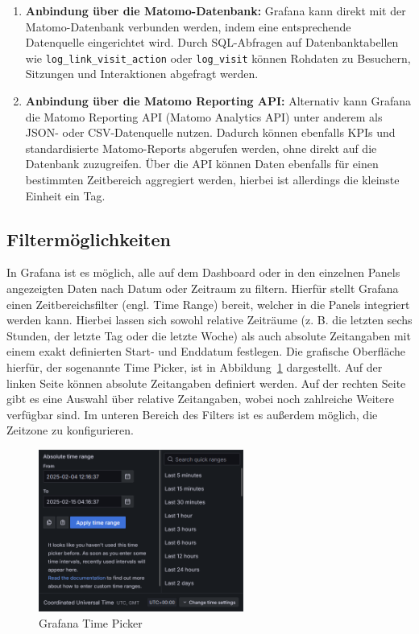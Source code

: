 \begin{enumerate}
    \item \textbf{Anbindung über die Matomo-Datenbank:}  
    Grafana kann direkt mit der Matomo-Datenbank verbunden werden, indem eine entsprechende Datenquelle eingerichtet wird. Durch SQL-Abfragen auf Datenbanktabellen wie \verb|log_link_visit_action| oder \verb|log_visit| können Rohdaten zu Besuchern, Sitzungen und Interaktionen abgefragt werden. 
    \item \textbf{Anbindung über die Matomo Reporting API:}  
    Alternativ kann Grafana die Matomo Reporting API (Matomo Analytics API) unter anderem als JSON- oder CSV-Datenquelle nutzen. Dadurch können ebenfalls KPIs und standardisierte Matomo-Reports abgerufen werden, ohne direkt auf die Datenbank zuzugreifen. Über die API können Daten ebenfalls für einen bestimmten Zeitbereich aggregiert werden, hierbei ist allerdings die kleinste Einheit ein Tag.
\end{enumerate}

\subsection{Filtermöglichkeiten}
In Grafana ist es möglich, alle auf dem Dashboard oder in den einzelnen Panels angezeigten Daten nach Datum oder Zeitraum zu filtern. Hierfür stellt Grafana einen Zeitbereichsfilter (engl. Time Range) bereit, welcher in die Panels integriert werden kann. Hierbei lassen sich sowohl relative Zeiträume (z. B. die letzten sechs Stunden, der letzte Tag oder die letzte Woche) als auch absolute Zeitangaben mit einem exakt definierten Start- und Enddatum festlegen. Die grafische Oberfläche hierfür, der sogenannte Time Picker, ist in Abbildung~\ref{fig:timerange} dargestellt. Auf der linken Seite können absolute Zeitangaben definiert werden. Auf der rechten Seite gibt es eine Auswahl über relative Zeitangaben, wobei noch zahlreiche Weitere verfügbar sind. Im unteren Bereich des Filters ist es außerdem möglich, die Zeitzone zu konfigurieren. \parencite{GrafanaTimePicker}

\begin{figure}[H]
    \centering
    \includegraphics[width=0.6\textwidth, keepaspectratio]{images/timerange.png}
    \caption{Grafana Time Picker}
    \label{fig:timerange}
\end{figure}

